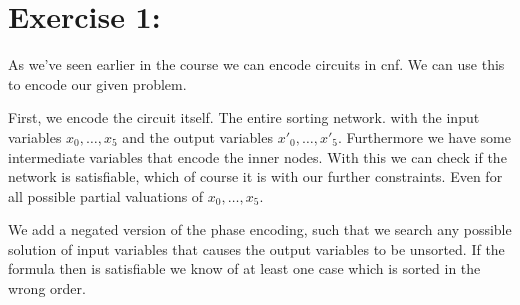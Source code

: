 \documentclass{base}
\begin{document}



\section*{Exercise 1:}

As we've seen earlier in the course we can encode circuits in cnf.
We can use this to encode our given problem.

First, we encode the circuit itself. The entire sorting network. with the input variables $x_0,\dots,x_5$ and the output variables $x'_0,\dots,x'_5$. Furthermore we have some intermediate variables that encode the inner nodes.
With this we can check if the network is satisfiable, which of course it is with our further constraints. Even for all possible partial valuations of $x_0,\dots,x_5$.

We add a negated version of the phase encoding, such that we search any possible solution of input variables that causes the output variables to be unsorted. If the formula then is satisfiable we know of at least one case which is sorted in the wrong order.
\end{document}
